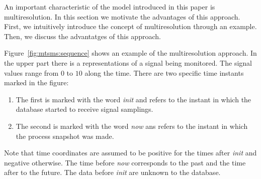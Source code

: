 


An important characteristic of the model introduced in this paper is
multiresolution. In this section we motivate the advantages of this
approach. First, we intuitively introduce the concept of
multiresolution through an example. Then, we discuss the advantatges of
this approach.

Figure~\ref{fig:mtsms:sequence} shows an example of the
multiresolution approach. 
%
In the upper part there is a representations of a signal being
monitored. The signal values range from $0$ to $10$ along the
time. There are two specific time instants marked in the figure:
\begin{enumerate}
\item The first is marked with the word \emph{init} and refers to the
  instant in which the database started to receive signal samplings.
\item The second is marked with the word \emph{now} ans refers to the
  instant in which the process snapshot was made.
\end{enumerate}
Note that time coordinates are assumed to be positive for the times
after \emph{init} and negative otherwise. The time before \emph{now}
corresponds to the past and the time after to the future.
The data before \emph{init} are unknown to the database.

